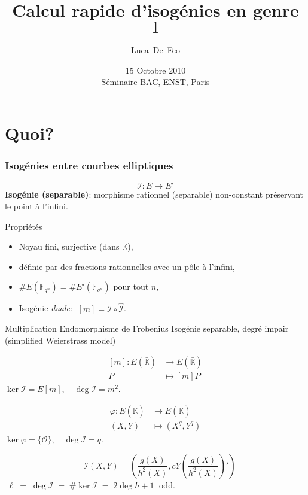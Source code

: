 \documentclass[10pt]{beamer}
\title{Calcul rapide d'isogénies en genre $1$}
\author{Luca~De~Feo}
\institute[INRIA Saclay]{INRIA Saclay, Projet TANC}
\date[ENST, Paris, 15 Octobre 2010]{15 Octobre 2010\\Séminaire BAC, ENST, Paris}
\newcommand{\clot}[1]{\bar{#1}}  %
\newcommand{\card}[1]{\# #1}  %
\newcommand{\K}{\mathbb{K}}  %
\newcommand{\F}{\mathbb{F}}  %
\newcommand{\frob}{\varphi}  %
\newcommand{\0}{\mathcal{O}}  %
\newcommand{\isog}[1]{\mathcal{#1}}  %
\newcommand{\I}{\isog{I}}  %
\begin{document}
\begin{frame}
  \titlepage
\end{frame}


\section{Quoi?}

\begin{frame}
  \frametitle{Isogénies entre courbes elliptiques}
  
  \vspace{-2mm}

  {\large \[\I:E\to E'\]}
  \textbf{Isogénie (separable)}: morphisme rationnel (separable)
  non-constant préservant le point à l'infini.
  
  \begin{block}{Propriétés}
    \begin{itemize}
    \item Noyau fini, surjective (dans $\clot{\K}$), 
    \item définie par des fractions rationnelles avec un pôle à l'infini,
    \item $\card{E(\F_{q^n})} = \card{E'(\F_{q^n})}$ pour tout $n$,
    \item Isogénie \emph{duale}: $\;[m] = \I\circ\hat{\I}$.
    \end{itemize}
  \end{block}

  \vspace{-1mm}

  \begin{block}{
	\begin{overprint}
	 Multiplication	
	\onslide<2> Endomorphisme de Frobenius
	\onslide<3> Isogénie separable, degré impair (simplified Weierstrass model)
	\end{overprint}
      }
    \begin{overprint}
      \[\begin{aligned}
	{}[m] : E(\clot{\K}) &\rightarrow E(\clot{\K})\\
	                   P &\mapsto [m]P
      \end{aligned}\]
      $\ker\I = E[m], \quad\deg\I = m^2$.

      \[\begin{aligned}
	\frob : E(\clot{\K}) &\rightarrow E(\clot{\K})\\
	               (X,Y) &\mapsto (X^q,Y^q)
      \end{aligned}\]
      $\ker\frob = \{\0\}, \quad\deg\I = q$.

      \[\quad\I(X,Y) = \left(\frac{g(X)}{h^2(X)},
      cY\left(\frac{g(X)}{h^2(X)}\right)'\right)\]
      $\;\ell\;=\;\deg\I\;=\;
      \card{\ker\I} \;=\; 2\deg h + 1\;$ odd.
    \end{overprint}
  \end{block}
\end{frame}
\end{document}
